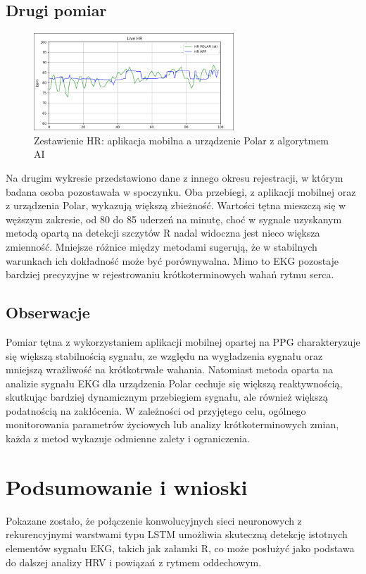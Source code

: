 \documentclass{article}
\begin{document}
\newpage
\subsection{Drugi pomiar}
\begin{figure}[h]
    \centering
    \includegraphics[width=0.67\textwidth]{image-4.png}
    \caption{Zestawienie HR: aplikacja mobilna a urządzenie Polar z algorytmem AI}
\end{figure}

Na drugim wykresie przedstawiono dane z innego okresu rejestracji, w którym badana osoba pozostawała w spoczynku. Oba przebiegi, z aplikacji mobilnej oraz z  urządzenia Polar, wykazują większą zbieżność. Wartości tętna mieszczą się w węższym zakresie, od 80 do 85 uderzeń na minutę, choć w sygnale uzyskanym metodą opartą na detekcji szczytów R nadal widoczna jest nieco większa zmienność. Mniejsze różnice między metodami sugerują, że w stabilnych warunkach ich dokładność może być porównywalna. Mimo to EKG pozostaje bardziej precyzyjne w rejestrowaniu krótkoterminowych wahań rytmu serca.

\subsection{Obserwacje}
Pomiar tętna z wykorzystaniem aplikacji mobilnej opartej na PPG charakteryzuje się większą stabilnością sygnału, ze względu na wygładzenia sygnału oraz mniejszą wrażliwość na krótkotrwałe wahania. Natomiast metoda oparta na analizie sygnału EKG dla urządzenia Polar cechuje się większą reaktywnością, skutkując bardziej dynamicznym przebiegiem sygnału, ale również większą podatnością na zakłócenia. W zależności od przyjętego celu, ogólnego monitorowania parametrów życiowych lub analizy krótkoterminowych zmian, każda z metod wykazuje odmienne zalety i ograniczenia.

\newpage
\section{Podsumowanie i wnioski}
Pokazane zostało, że połączenie konwolucyjnych sieci neuronowych z rekurencyjnymi warstwami typu LSTM umożliwia skuteczną detekcję istotnych elementów sygnału EKG, takich jak załamki R, co może posłużyć jako podstawa do dalszej analizy HRV i powiązań z rytmem oddechowym.
\end{document}
